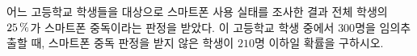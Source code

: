 어느 고등학교 학생들을 대상으로 스마트폰 사용 실태를 조사한 결과 전체 학생의 $25\mkern3mu \%$가 스마트폰 중독이라는 판정을 받았다. 이 고등학교 학생 중에서 $300$명을 임의추출할 때, 스마트폰 중독 판정을 받지 않은 학생이 $210$명 이하일 확률을 구하시오. 
